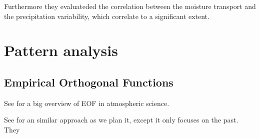 Furthermore they evaluateded the correlation between the moisture transport and the precipitation variability, which correlate to a significant extent.

\section{Pattern analysis}

\subsection{Empirical Orthogonal Functions}

See \cite{hannachi2007eof_review} for a big overview of EOF in atmospheric science.

See \cite{Ayantobo2021IntegratedMT} for an similar approach as we plan it, except it only focuses on the past.
They 
